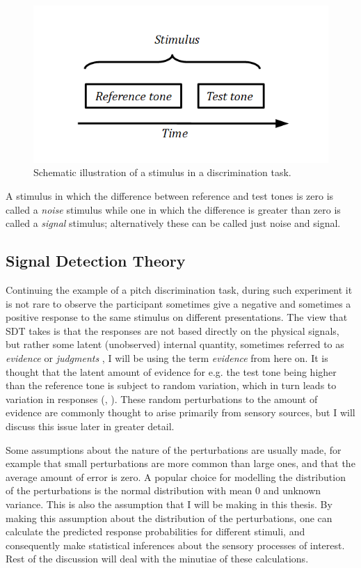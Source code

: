 \documentclass{article}\usepackage{knitr}
\begin{document}
\begin{figure}[!htb]
\centering
\includegraphics[scale = 0.5]{DiscriminationTask}
\caption{Schematic illustration of a stimulus in a discrimination task.}
\label{fig:discrtask}
\end{figure}

A stimulus in which the difference between reference and test tones is zero is called a \textit{noise} stimulus while one in which the difference is greater than zero is called a \textit{signal} stimulus; alternatively these can be called just noise and signal. 

\subsection{Signal Detection Theory}

Continuing the example of a  pitch discrimination task, during such experiment it is not rare to observe the participant sometimes give a negative and sometimes a positive response to the same stimulus on different presentations. The view that SDT takes is that the responses are not based directly on the physical signals, but rather some latent (unobserved) internal quantity, sometimes referred to as \textit{evidence} \citep{wickens2002} or \textit{judgments} \cite{stigler2003}, I will be using the term \textit{evidence} from here on. It is thought that the latent amount of evidence for e.g. the test tone being higher than the reference tone is subject to random variation, which in turn leads to variation in responses (\citet[p. 154]{kingdomprins2010}, \citet[p. 11]{wickens2002}). These random perturbations to the amount of evidence are commonly thought to arise primarily from sensory sources, but I will discuss this issue later in greater detail.

Some assumptions about the nature of the perturbations are usually made, for example that small perturbations are more common than large ones, and that the average amount of error is zero. A popular choice for modelling the distribution of the perturbations is the normal distribution with mean 0 and unknown variance. This is also the assumption that I will be making in this thesis. By making this assumption about the distribution of the perturbations, one can calculate the predicted response probabilities for different stimuli, and consequently make statistical inferences about the sensory processes of interest. Rest of the discussion will deal with the minutiae of these calculations. 
\end{document}
